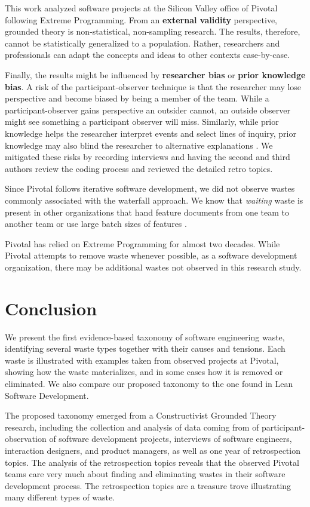This work analyzed software projects at the Silicon Valley office of Pivotal following Extreme Programming. From an \textbf{external validity} perspective, grounded theory is non-statistical, non-sampling research. The results, therefore, cannot be statistically generalized to a population. Rather, researchers and professionals can adapt the concepts and ideas to other contexts case-by-case.

Finally, the results might be influenced by \textbf{researcher bias} or \textbf{prior knowledge bias}. A risk of the participant-observer technique is that the researcher may lose perspective and become biased by being a member of the team. While a participant-observer gains perspective an outsider cannot, an outside observer might see something a participant observer will miss. Similarly, while prior knowledge helps the researcher interpret events and select lines of inquiry, prior knowledge may also blind the researcher to alternative explanations \cite{GlaserIssues}. We mitigated these risks by recording interviews and having the second and third authors review the coding process and reviewed the detailed retro topics.

Since Pivotal follows iterative software development, we did not observe wastes commonly associated with the waterfall approach. We know that \textit{waiting} waste is present in other organizations that hand feature documents from one team to another team or use large batch sizes of features \cite{Ali2016, Khurum2014, Mujtaba2010}.

Pivotal has relied on Extreme Programming for almost two decades. While Pivotal attempts to remove waste whenever possible, as a  software development organization, there may be additional wastes not observed in this research study. 
\section{Conclusion}
\label{Conclusion}
We present the first evidence-based taxonomy of software engineering waste, identifying several waste types together with their causes and tensions. Each waste is illustrated with examples taken from observed projects at Pivotal, showing how the waste materializes, and in some cases how it is removed or eliminated. We also compare our proposed taxonomy to the one found in Lean Software Development.

The proposed taxonomy emerged from a Constructivist Grounded Theory research, including the collection and analysis of data coming from \durationOfResearchStudyPlural{} of participant-observation of \numberOfObservedProjects{} software development projects, interviews of \numberOfInterviews{} software engineers, interaction designers, and product managers, as well as one year of retrospection topics. The analysis of the retrospection topics reveals that the observed Pivotal teams care very much about finding and eliminating wastes in their software development process. The retrospection topics are a treasure trove illustrating many different types of waste. 

